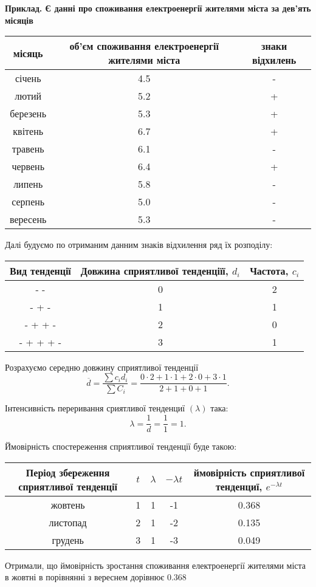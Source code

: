 \documentclass[a4paper, fontsize=10pt, oneside]{article}
\begin{document}
\bf Приклад. \rm Є данні про споживання електроенергії жителями міста за дев'ять місяців
\newline  \newline 
\begin{tabular}{| c | c | c |}
\hline
місяць &об'єм споживання електроенергії жителями міста &знаки відхилень \\
\hline
січень &4.5 &- \\
\hline
лютий &5.2 &+ \\
\hline
березень &5.3 &+ \\
\hline
квітень &6.7 &+ \\
\hline
травень &6.1 &- \\
\hline
червень &6.4 &+ \\
\hline
липень &5.8 &- \\
\hline
серпень &5.0 &- \\
\hline
вересень &5.3 &- \\
\hline
\end{tabular}
\newline  \newline 
Далі будуємо по отриманим данним знаків відхилення ряд їх розподілу:
\newline \newline 
\begin{tabular}{| c | c | c |}
\hline
Вид тенденції &Довжина сприятливої тенденціїї, $d_{i}$ &Частота, $c_{i}$ \\
\hline
- - & 0 &2 \\
\hline
- + -& 1 &1 \\
\hline
- + + - & 2 &0 \\
\hline
- + + + - & 3 &1 \\
\hline
\end{tabular}
\newline  \newline 

Розрахуємо середню довжину сприятливої тенденції
$$\overline{d} = \frac{\sum c_{i}d_{i}}{\sum C_{i}} = \frac{0\cdot2 + 1\cdot1 + 2\cdot0 + 3 \cdot 1}{2 + 1 + 0 +1}.$$

Інтенсивність переривання сриятливої тенденциї $(\lambda)$ така: $$\lambda = \frac{1}{d} = \frac{1}{1} = 1.$$

Ймовірність спостереження сприятливої тенденції буде такою:
\newline \newline
\begin{tabular}{|c|c|c|c|c|}
\hline
Період збереження сприятливої тенденції & $t$ & $\lambda$ & $-\lambda t$ & ймовірність сприятливої тенденциї, $e^{-\lambda t}$ \\
\hline
жовтень & 1 & 1 & -1 & 0.368\\
\hline
листопад & 2 & 1 & -2 & 0.135\\
\hline
грудень & 3 & 1 & -3 & 0.049\\
\hline
\end{tabular}
\newline \newline
Отримали, що ймовірність зростання споживання електроенергії жителями міста в жовтні в порівнянні з вереснем дорівнює 0.368
\end{document}

